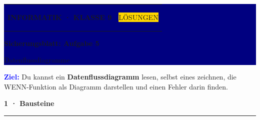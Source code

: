 \documentclass[11pt,a4paper]{article}
\newcommand{\sectiontitle}[2]{%
  \vspace{4mm}
  {\color{#1}\bfseries\large #2}\par
  \vspace{1.2mm}
  {\color{#1}\rule{\linewidth}{0.7pt}}\par
  \vspace{2mm}
}
\begin{document}
\colorbox{Navy}{%
  \parbox{\dimexpr\linewidth-2\fboxsep\relax}{%
    \vspace{3mm}
    \color{white}
    \begin{tabularx}{\linewidth}{@{}Xr@{}}
      {\small\bfseries INFORMATIK · KLASSE 9} &
      \colorbox{Gold}{\color{Navy}\small\bfseries\strut LÖSUNGEN}
    \end{tabularx}
    \vspace{2.5mm}

    {\fontsize{22}{25}\selectfont\bfseries Sicherungsblatt: Aufgabe 5}\par
    \vspace{1mm}
    {\large Datenflussdiagramme}
    \vspace{3mm}
  }%
}

\vspace{4mm}
\colorbox{Sky}{%
  \parbox{\dimexpr\linewidth-2\fboxsep\relax}{%
    \vspace{2.4mm}
    \textcolor{Blue}{\bfseries Ziel:}
    Du kannst ein \textbf{Datenflussdiagramm} lesen, selbst eines zeichnen,
    die WENN-Funktion als Diagramm darstellen und einen Fehler darin finden.
    \vspace{2.4mm}
  }%
}

\sectiontitle{Blue}{1 · Bausteine}
\end{document}
